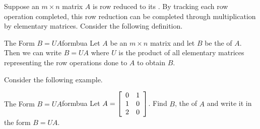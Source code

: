 Suppose an $m \times n$ matrix $A$ is row reduced to its {\rref}. By tracking each row operation completed, this row reduction can be completed through multiplication by elementary matrices. Consider the following definition.

\begin{definition}{The Form $B=UA$}{formbua}
Let $A$ be an $m \times n$ matrix and let $B$ be the {\rref} of $A$. Then we can write $B = UA$ where $U$ is the product of all elementary matrices representing the row operations done to $A$ to obtain $B$. 
\end{definition}

Consider the following example.

\begin{example}{The Form $B=UA$}{formbua}
Let $A = \left[
\begin{array}{rr}
0 & 1 \\
1 & 0 \\
2 & 0
\end{array}
\right]$. Find $B$, the {\rref} of $A$ and write it in the form $B=UA$.
\end{example}

